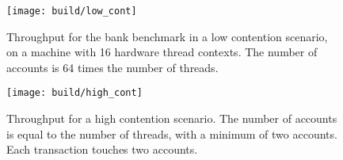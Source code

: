 
\begin{figure}
  \centering \texttt{[image: build/low\_cont]}

\caption{Throughput for the bank benchmark in a low contention scenario,
on a machine with 16 hardware thread contexts.  The number of accounts
is 64 times the number of threads.}

  \label{fig:lowcont}
\end{figure}

\begin{figure}
  \centering \texttt{[image: build/high\_cont]}

\caption{Throughput for a high contention scenario.  The number of accounts is
equal to the number of threads, with a minimum of two accounts.  Each
transaction touches two accounts.}

  \label{fig:highcont}
\end{figure}

